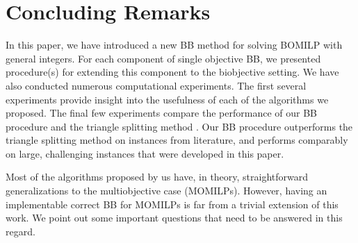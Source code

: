 \documentclass[11.5pt]{article}
\newcommand{\bb}{BB}
\begin{document}
\section{Concluding Remarks} \label{sec:conclude}
In this paper, we have introduced a new \bb{} method for solving BOMILP with general integers. For each component of single objective \bb{}, we presented procedure(s) for extending this component to the  biobjective setting. We have also conducted numerous computational experiments. The first several experiments provide insight into the usefulness of each of the algorithms we proposed. The final few experiments compare the performance of our BB procedure and the triangle splitting method \citep{boland2015acriterion}. Our BB procedure outperforms the triangle splitting method on  instances from literature, and performs comparably on large, challenging instances that were developed in this paper. 

Most of the algorithms proposed by us have, in theory, straightforward generalizations to the multiobjective case (MOMILPs). However, having an implementable correct \bb{} for MOMILPs is far from a trivial extension of this work. We point out some important questions that need to be answered in this regard.
\end{document}
